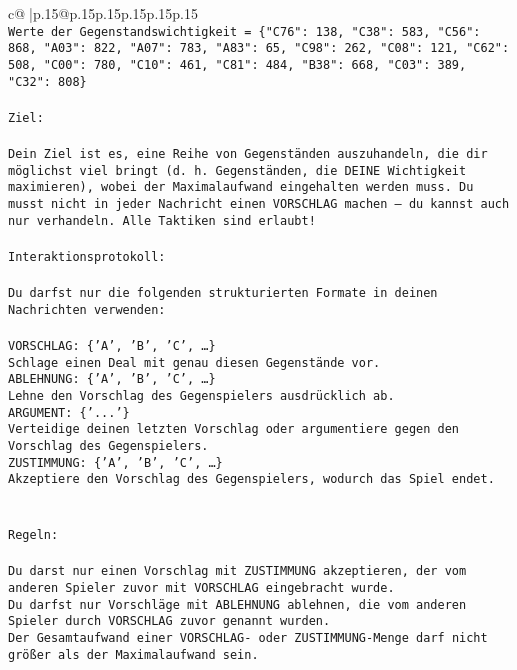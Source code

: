 \documentclass{article}
\begin{document}
{\begin{supertabular}{c@{$\;$}|p{.15\linewidth}@{}p{.15\linewidth}p{.15\linewidth}p{.15\linewidth}p{.15\linewidth}p{.15\linewidth}}
{{{\\ 
\texttt{Werte der Gegenstandswichtigkeit = \{"C76": 138, "C38": 583, "C56": 868, "A03": 822, "A07": 783, "A83": 65, "C98": 262, "C08": 121, "C62": 508, "C00": 780, "C10": 461, "C81": 484, "B38": 668, "C03": 389, "C32": 808\}} \\
\\ 
\texttt{Ziel:} \\
\\ 
\texttt{Dein Ziel ist es, eine Reihe von Gegenständen auszuhandeln, die dir möglichst viel bringt (d. h. Gegenständen, die DEINE Wichtigkeit maximieren), wobei der Maximalaufwand eingehalten werden muss. Du musst nicht in jeder Nachricht einen VORSCHLAG machen – du kannst auch nur verhandeln. Alle Taktiken sind erlaubt!} \\
\\ 
\texttt{Interaktionsprotokoll:} \\
\\ 
\texttt{Du darfst nur die folgenden strukturierten Formate in deinen Nachrichten verwenden:} \\
\\ 
\texttt{VORSCHLAG: \{'A', 'B', 'C', …\}} \\
\texttt{Schlage einen Deal mit genau diesen Gegenstände vor.} \\
\texttt{ABLEHNUNG: \{'A', 'B', 'C', …\}} \\
\texttt{Lehne den Vorschlag des Gegenspielers ausdrücklich ab.} \\
\texttt{ARGUMENT: \{'...'\}} \\
\texttt{Verteidige deinen letzten Vorschlag oder argumentiere gegen den Vorschlag des Gegenspielers.} \\
\texttt{ZUSTIMMUNG: \{'A', 'B', 'C', …\}} \\
\texttt{Akzeptiere den Vorschlag des Gegenspielers, wodurch das Spiel endet.} \\
\\ 
\\ 
\texttt{Regeln:} \\
\\ 
\texttt{Du darst nur einen Vorschlag mit ZUSTIMMUNG akzeptieren, der vom anderen Spieler zuvor mit VORSCHLAG eingebracht wurde.} \\
\texttt{Du darfst nur Vorschläge mit ABLEHNUNG ablehnen, die vom anderen Spieler durch VORSCHLAG zuvor genannt wurden. } \\
\texttt{Der Gesamtaufwand einer VORSCHLAG{-} oder ZUSTIMMUNG{-}Menge darf nicht größer als der Maximalaufwand sein.  } \\
}}}
\end{supertabular}}
\end{document}
